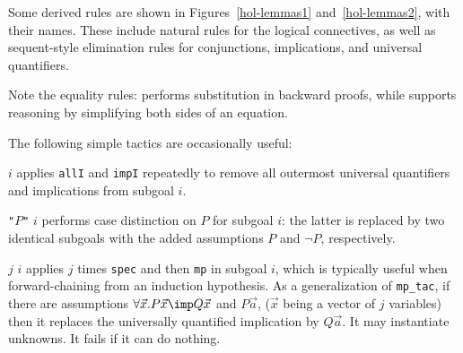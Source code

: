 Some derived rules are shown in Figures~\ref{hol-lemmas1}
and~\ref{hol-lemmas2}, with their {\ML} names.  These include natural rules
for the logical connectives, as well as sequent-style elimination rules for
conjunctions, implications, and universal quantifiers.  

Note the equality rules:  performs substitution in
backward proofs, while  supports reasoning by
simplifying both sides of an equation.

The following simple tactics are occasionally useful:
\begin{ttdescription}
\item[\ttindexbold{strip_tac} $i$] applies \texttt{allI} and \texttt{impI}
  repeatedly to remove all outermost universal quantifiers and implications
  from subgoal $i$.
\item[\ttindexbold{case_tac} {\tt"}$P${\tt"} $i$] performs case distinction on
  $P$ for subgoal $i$: the latter is replaced by two identical subgoals with
  the added assumptions $P$ and $\lnot P$, respectively.
\item[\ttindexbold{smp_tac} $j$ $i$] applies $j$ times \texttt{spec} and then
  \texttt{mp} in subgoal $i$, which is typically useful when forward-chaining 
  from an induction hypothesis. As a generalization of \texttt{mp_tac}, 
  if there are assumptions $\forall \vec{x}. P \vec{x} \imp Q \vec{x}$ and 
  $P \vec{a}$, ($\vec{x}$ being a vector of $j$ variables)
  then it replaces the universally quantified implication by $Q \vec{a}$. 
  It may instantiate unknowns. It fails if it can do nothing.
\end{ttdescription}


